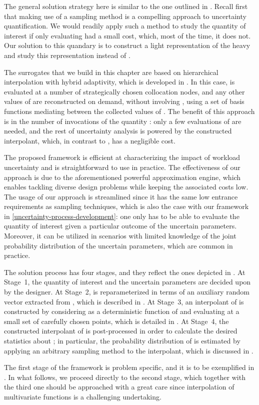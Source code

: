 The general solution strategy here is similar to the one outlined in
. Recall first that making use of a sampling method is a
compelling approach to uncertainty quantification. We would readily apply such a
method to study the quantity of interest \g if only evaluating \g had a small
cost, which, most of the time, it does not. Our solution to this quandary is to
construct a light representation of the heavy \g and study this representation
instead of \g.

The surrogates that we build in this chapter are based on hierarchical
interpolation with hybrid adaptivity, which is developed in \cite{klimke2006,
ma2009, jakeman2012}. In this case, \g is evaluated at a number of strategically
chosen collocation nodes, and any other values of \g are reconstructed on
demand, without involving \g, using a set of basis functions mediating between
the collected values of \g. The benefit of this approach is in the number of
invocations of the quantity \g: only a few evaluations of \g are needed, and the
rest of uncertainty analysis is powered by the constructed interpolant, which,
in contrast to \g, has a negligible cost.

The proposed framework is efficient at characterizing the impact of workload
uncertainty and is straightforward to use in practice. The effectiveness of our
approach is due to the aforementioned powerful approximation engine, which
enables tackling diverse design problems while keeping the associated costs low.
The usage of our approach is streamlined since it has the same low entrance
requirements as sampling techniques, which is also the case with our framework
in \cref{uncertainty-process-development}: one only has to be able to evaluate
the quantity of interest given a particular outcome of the uncertain parameters.
Moreover, it can be utilized in scenarios with limited knowledge of the joint
probability distribution of the uncertain parameters, which are common in
practice.

The solution process has four stages, and they reflect the ones depicted in
. At Stage~1, the quantity of interest \g and the uncertain
parameters \vu are decided upon by the designer. At Stage~2, \g is
reparameterized in terms of an auxiliary random vector \vz extracted from \vu,
which is described in . At Stage~3, an interpolant of
\g is constructed by considering \g as a deterministic function of \vz and
evaluating \g at a small set of carefully chosen points, which is detailed in
. At Stage~4, the constructed interpolant of \g is
post-processed in order to calculate the desired statistics about \g; in
particular, the probability distribution of \g is estimated by applying an
arbitrary sampling method to the interpolant, which is discussed in
.

The first stage of the framework is problem specific, and it is to be
exemplified in . In what follows, we proceed directly to
the second stage, which together with the third one should be approached with a
great care since interpolation of multivariate functions is a challenging
undertaking.
